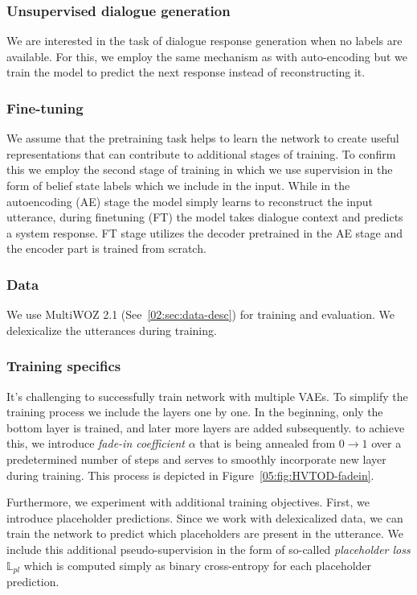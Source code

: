 \subsubsection{Unsupervised dialogue generation}
We are interested in the task of dialogue response generation when no labels are available.
For this, we employ the same mechanism as with auto-encoding but we train the model to predict the next response instead of reconstructing it.

\subsubsection{Fine-tuning}
We assume that the pretraining task helps to learn the network to create useful representations that can contribute to additional stages of training.
To confirm this we employ the second stage of training in which we use supervision in the form of belief state labels which we include in the input.
While in the autoencoding (AE) stage the model simply learns to reconstruct the input utterance, during finetuning (FT) the model takes dialogue context and predicts a system response.
FT stage utilizes the decoder pretrained in the AE stage and the encoder part is trained from scratch.

\subsubsection{Data}
We use MultiWOZ 2.1 (See~\ref{02:sec:data-desc}) for training and evaluation.
We delexicalize the utterances during training.
\subsubsection{Training specifics}
It's challenging to successfully train network with multiple VAEs. 
To simplify the training process we include the layers one by one.
In the beginning, only the bottom layer is trained, and later more layers are added subsequently.
to achieve this, we introduce \emph{fade-in coefficient} $\alpha$ that is being annealed from $0 \rightarrow 1$ over a predetermined number of steps and serves to smoothly incorporate new layer during training.
This process is depicted in Figure~\ref{05:fig:HVTOD-fadein}.

Furthermore, we experiment with additional training objectives.
First, we introduce placeholder predictions.
Since we work with delexicalized data, we can train the network to predict which placeholders are present in the utterance.
We include this additional pseudo-supervision in the form of so-called \emph{placeholder loss} $\mathbb{L}_{pl}$ which is computed simply as binary cross-entropy for each placeholder prediction.


